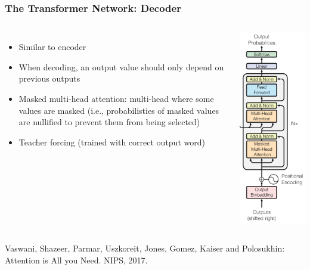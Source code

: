 \documentclass[10pt]{beamer}
\begin{document}
\begin{frame}
  \frametitle{The Transformer Network: Decoder}
  \begin{columns}
\begin{itemize}
\setlength\itemsep{.8em}
\item Similar to encoder
\item When decoding, an output value should only depend on previous outputs
\item Masked multi-head attention: multi-head where some values are 
masked (i.e., probabilisties of masked values are nullified to prevent them from being selected)
\item Teacher forcing (trained with correct output word)
\end{itemize}
\begin{center}
	\includegraphics[width=.5\columnwidth]{images/dec}
\end{center}
    \end{columns}
\vspace{.25cm}
\scriptsize{Vaswani, Shazeer, Parmar, Uszkoreit, Jones, Gomez, Kaiser and Polosukhin: Attention is All you Need. NIPS, 2017.}
\end{frame}
\end{document}
